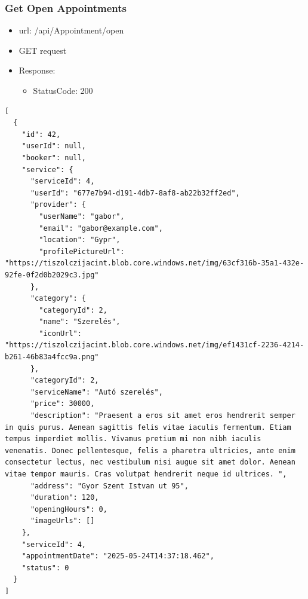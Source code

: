 \documentclass[11pt]{article}
\begin{document}
\subsubsection{Get Open Appointments}
\label{sec:orgaa135bb}
\begin{itemize}
\item url: /api/Appointment/open
\item GET request
\item Response:
\begin{itemize}
\item StatusCode: 200
\end{itemize}
\end{itemize}
\begin{verbatim}
[
  {
    "id": 42,
    "userId": null,
    "booker": null,
    "service": {
      "serviceId": 4,
      "userId": "677e7b94-d191-4db7-8af8-ab22b32ff2ed",
      "provider": {
        "userName": "gabor",
        "email": "gabor@example.com",
        "location": "Gypr",
        "profilePictureUrl": "https://tiszolczijacint.blob.core.windows.net/img/63cf316b-35a1-432e-92fe-0f2d0b2029c3.jpg"
      },
      "category": {
        "categoryId": 2,
        "name": "Szerelés",
        "iconUrl": "https://tiszolczijacint.blob.core.windows.net/img/ef1431cf-2236-4214-b261-46b83a4fcc9a.png"
      },
      "categoryId": 2,
      "serviceName": "Autó szerelés",
      "price": 30000,
      "description": "Praesent a eros sit amet eros hendrerit semper in quis purus. Aenean sagittis felis vitae iaculis fermentum. Etiam tempus imperdiet mollis. Vivamus pretium mi non nibh iaculis venenatis. Donec pellentesque, felis a pharetra ultricies, ante enim consectetur lectus, nec vestibulum nisi augue sit amet dolor. Aenean vitae tempor mauris. Cras volutpat hendrerit neque id ultrices. ",
      "address": "Gyor Szent Istvan ut 95",
      "duration": 120,
      "openingHours": 0,
      "imageUrls": []
    },
    "serviceId": 4,
    "appointmentDate": "2025-05-24T14:37:18.462",
    "status": 0
  }
]
\end{verbatim}
\end{document}
